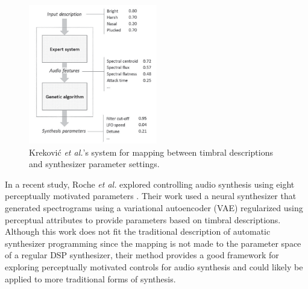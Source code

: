 \begin{figure}[ht]
    \centering
    \includegraphics[width=0.5\textwidth]{figures/background/krekovic-descriptive.png}
    \caption{Krekovi\'{c} \textit{et al.}'s \cite{krekovic2016algorithm} system for mapping between timbral descriptions and synthesizer parameter settings. }
    \label{fig:krekovic-desc}
\end{figure}



In a recent study, Roche \textit{et al.} explored controlling audio synthesis using eight perceptually motivated parameters \cite{roche2021make}. Their work used a neural synthesizer that generated spectrograms using a variational autoencoder (VAE) regularized using perceptual attributes to provide parameters based on timbral descriptions. Although this work does not fit the traditional description of automatic synthesizer programming since the mapping is not made to the parameter space of a regular DSP synthesizer, their method provides a good framework for exploring perceptually motivated controls for audio synthesis and could likely be applied to more traditional forms of synthesis.

